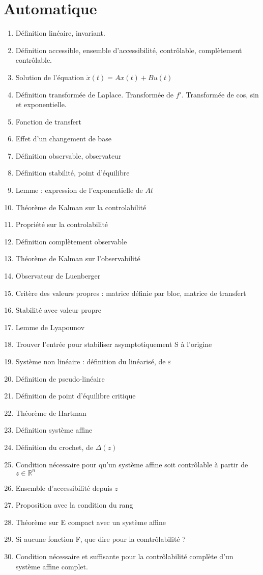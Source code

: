 \documentclass{article}
\begin{document}
\setcounter{tocdepth}{4}
\tableofcontents
\newpage

\part{Automatique}
\begin{enumerate}
\item Définition linéaire, invariant.
\item Définition accessible, ensemble d'accessibilité, contrôlable, complètement contrôlable.
\item Solution de l'équation $\dot{x}(t)=Ax(t)+Bu(t)$
\item Définition transformée de Laplace. Transformée de $f'$. Transformée de cos, sin et exponentielle.
\item Fonction de transfert
\item Effet d'un changement de base
\item Définition observable, observateur
\item Définition stabilité, point d'équilibre
\item Lemme : expression de l'exponentielle de $At$
\item Théorème de Kalman sur la controlabilité
\item Propriété sur la controlabilité
\item Définition complètement observable
\item Théorème de Kalman sur l'observabilité
\item Observateur de Luenberger
\item Critère des valeurs propres : matrice définie par bloc, matrice de transfert
\item Stabilité avec valeur propre
\item Lemme de Lyapounov
\item Trouver l'entrée pour stabiliser asymptotiquement S à l'origine
\item Système non linéaire : définition du linéarisé, de $\varepsilon$
\item Définition de pseudo-linéaire
\item Définition de point d'équilibre critique
\item Théorème de Hartman
\item Définition système affine
\item Définition du crochet, de $\Delta(z)$
\item Condition nécessaire pour qu'un système affine soit contrôlable à partir de $z\in\mathbb{R}^n$
\item Ensemble d'accessibilité depuis $z$
\item Proposition avec la condition du rang
\item Théorème sur E compact avec un système affine
\item Si aucune fonction F, que dire pour la comtrôlabilité ?
\item Condition nécessaire et suffisante pour la contrôlabilité complète d'un système affine complet.
\end{enumerate}
\end{document}
